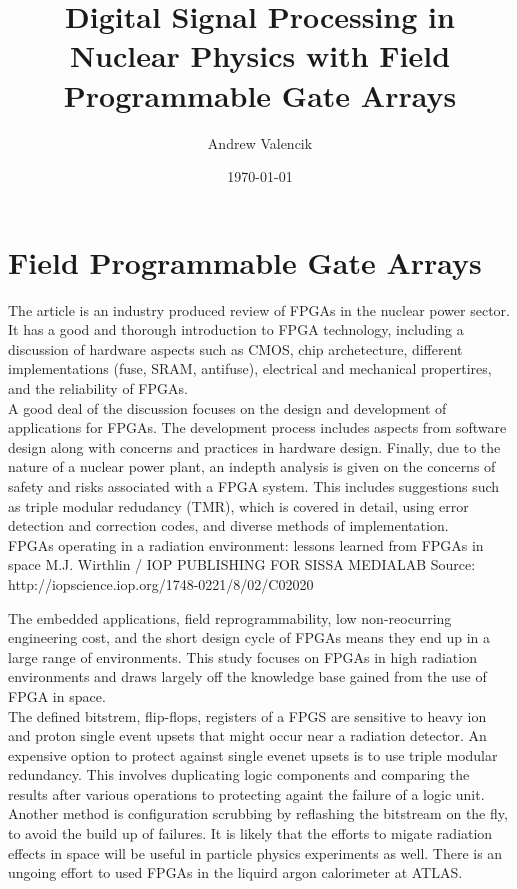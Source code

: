 \documentclass[12pt]{article}
\begin{document}
\title{Digital Signal Processing in Nuclear Physics with Field Programmable Gate Arrays}

\author{Andrew Valencik}

\date{\today}

\maketitle


\section{Field Programmable Gate Arrays}

\citep{currentState}

The article is an industry produced review of FPGAs in the nuclear power sector. It has a good and thorough introduction to FPGA technology, including a discussion of hardware aspects such as CMOS, chip archetecture, different implementations (fuse, SRAM, antifuse), electrical and mechanical propertires, and the reliability of FPGAs.
\\
A good deal of the discussion focuses on the design and development of applications for FPGAs. The development process includes aspects from software design along with concerns and practices in hardware design. Finally, due to the nature of a nuclear power plant, an indepth analysis is given on the concerns of safety and risks associated with a FPGA system. This includes suggestions such as triple modular redudancy (TMR), which is covered in detail, using error detection and correction codes, and diverse methods of implementation.
\\


\cite{Wirthlin}
FPGAs operating in a radiation environment: lessons learned from FPGAs in space
M.J. Wirthlin / IOP PUBLISHING FOR SISSA MEDIALAB
Source: http://iopscience.iop.org/1748-0221/8/02/C02020

The embedded applications, field reprogrammability, low non-reocurring engineering cost, and the short design cycle of FPGAs means they end up in a large range of environments. This study focuses on FPGAs in high radiation environments and draws largely off the knowledge base gained from the use of FPGA in space. 
\\
The defined bitstrem, flip-flops, registers of a FPGS are sensitive to heavy ion and proton single event upsets that might occur near a radiation detector. An expensive option to protect against single evenet upsets is to use triple modular redundancy. This involves duplicating logic components and comparing the results after various operations to protecting againt the failure of a logic unit. Another method is configuration scrubbing by reflashing the bitstream on the fly, to avoid the build up of failures. It is likely that the efforts to migate radiation effects in space will be useful in particle physics experiments as well. There is an ungoing effort to used FPGAs in the liquird argon calorimeter at ATLAS. 
\\
\end{document}
